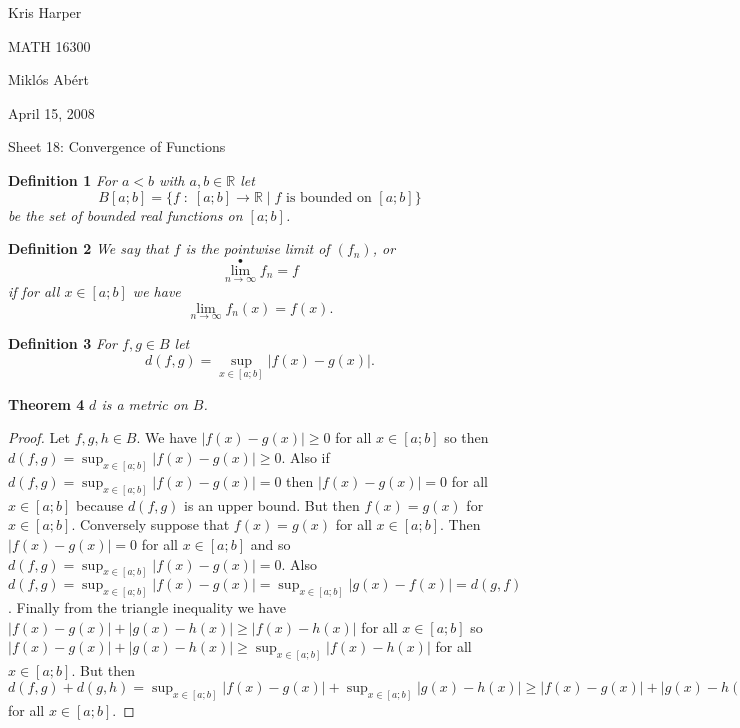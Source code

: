 \documentclass{article}
\begin{document}
\begin{flushright}
Kris Harper

MATH 16300

Mikl\'{o}s Ab\'{e}rt

April 15, 2008
\end{flushright}

\begin{flushleft}

\Large

Sheet 18: Convergence of Functions\newline

\normalsize

\textbf{Definition 1}
\textsl{For $a < b$ with $a,b \in \mathbb{R}$ let
\[
B[a;b] = \{f \; : \; [a;b] \rightarrow \mathbb{R} \mid \text{$f$ is bounded on $[a;b]$}\}
\]
be the set of bounded real functions on $[a;b]$.}\newline

\textbf{Definition 2}
\textsl{We say that $f$ is the pointwise limit of $(f_n)$, or
\[
\lim_{n \rightarrow \infty}^{\bullet} f_n = f
\]
if for all $x \in [a;b]$ we have
\[
\lim_{n \rightarrow \infty} f_n (x) = f(x).
\]}\newline

\textbf{Definition 3}
\textsl{For $f,g \in B$ let
\[
d(f,g) = \sup_{x \in [a;b]} | f(x) - g(x) |.
\]}\newline

\textbf{Theorem 4}
\textsl{$d$ is a metric on $B$.}
\begin{proof}
Let $f,g,h \in B$. We have $|f(x) - g(x)| \geq 0$ for all $x \in [a;b]$ so then $d(f,g) = \sup_{x \in [a;b]} |f(x) - g(x)| \geq 0$. Also if $d(f,g) = \sup_{x \in [a;b]} |f(x) - g(x)| = 0$ then $|f(x) - g(x)| = 0$ for all $x \in [a;b]$ because $d(f,g)$ is an upper bound. But then $f(x) = g(x)$ for $x \in [a;b]$. Conversely suppose that $f(x) = g(x)$ for all $x \in [a;b]$. Then $|f(x) - g(x)| = 0$ for all $x \in [a;b]$ and so $d(f,g) = \sup_{x \in [a;b]} |f(x) - g(x)| = 0$. Also $d(f,g) = \sup_{x \in [a;b]} |f(x) - g(x)| = \sup_{x \in [a;b]} |g(x) - f(x)| = d(g,f)$. Finally from the triangle inequality we have $|f(x) - g(x)| + |g(x) - h(x)| \geq |f(x) - h(x)|$ for all $x \in [a;b]$ so $|f(x) - g(x)| + |g(x) - h(x)| \geq \sup_{x \in [a;b]} |f(x) - h(x)|$ for all $x \in [a;b]$. But then $d(f,g) + d(g,h) = \sup_{x \in [a;b]} |f(x) - g(x)| + \sup_{x \in [a;b]} |g(x) - h(x)| \geq |f(x) - g(x)| + |g(x) - h(x)| \geq \sup_{x \in [a;b]} |f(x) - h(x)| = d(f,h)$ for all $x \in [a;b]$.
\end{proof}


\end{flushleft}
\end{document}
